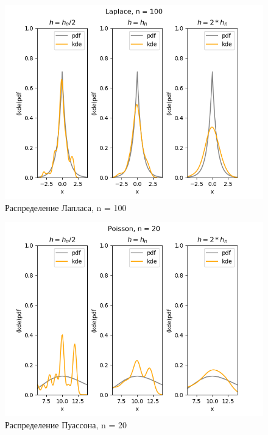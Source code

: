 \documentclass[../body.tex]{subfiles}
\begin{document}
\begin{figure}[H]
	\centering
	\includegraphics[width=\textwidth, height =0.4\textheight]{img/LaplaceKDE n = 100.png}
	\caption{Распределение Лапласа, n = 100}
	\label{fig:laplace_kde_100}
\end{figure}


\begin{figure}[H]
	\centering
	\includegraphics[width=\textwidth, height =0.4\textheight]{img/PoissonKDE n = 20.png}
	\caption{Распределение Пуассона, n = 20}
	\label{fig:poisson_kde_20}
\end{figure}
\end{document}
